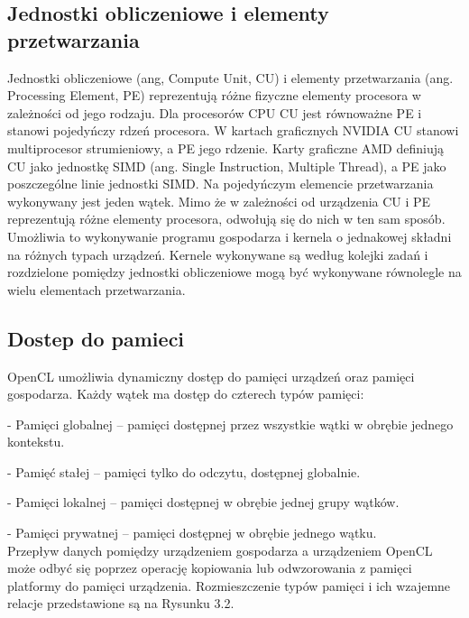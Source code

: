 \subsection{Jednostki obliczeniowe i elementy przetwarzania}\label{sec:OpenC3L}

Jednostki obliczeniowe (ang, Compute Unit, CU) i elementy przetwarzania (ang. Processing Element, PE) reprezentują różne fizyczne elementy procesora w zależności od jego rodzaju. Dla procesorów CPU CU jest równoważne PE i stanowi pojedyńczy rdzeń procesora. W kartach graficznych NVIDIA CU stanowi multiprocesor strumieniowy, a PE jego rdzenie. Karty graficzne AMD definiują CU jako jednostkę SIMD (ang. Single Instruction, Multiple Thread), a PE jako poszczególne linie jednostki SIMD. Na pojedyńczym elemencie przetwarzania wykonywany jest jeden wątek. Mimo że w zależności od urządzenia CU i PE reprezentują różne elementy procesora, odwołują się do nich w ten sam sposób. Umożliwia to wykonywanie programu gospodarza i kernela o jednakowej składni na różnych typach urządzeń. Kernele wykonywane są według kolejki zadań i rozdzielone pomiędzy jednostki obliczeniowe mogą być wykonywane równolegle na wielu elementach przetwarzania.

\subsection{Dostep do pamieci}\label{sec:OpenC6L}

OpenCL umożliwia dynamiczny dostęp do pamięci urządzeń oraz pamięci gospodarza. Każdy wątek ma dostęp do czterech typów pamięci:

- Pamięci globalnej – pamięci dostępnej przez wszystkie wątki w obrębie jednego kontekstu.

- Pamięć stałej – pamięci tylko do odczytu, dostępnej globalnie.

- Pamięci lokalnej – pamięci dostępnej w obrębie jednej grupy wątków.

- Pamięci prywatnej – pamięci dostępnej w obrębie jednego wątku.\\

Przepływ danych pomiędzy urządzeniem gospodarza a urządzeniem OpenCL może odbyć się poprzez operację kopiowania  lub odwzorowania z pamięci platformy do pamięci urządzenia. Rozmieszczenie typów pamięci i ich wzajemne relacje przedstawione są na Rysunku 3.2.

